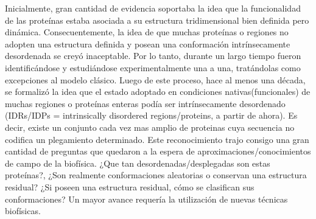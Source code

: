 Inicialmente, gran cantidad de evidencia soportaba la idea que la funcionalidad de las proteínas estaba asociada a su estructura tridimensional bien definida pero dinámica.
Consecuentemente, la idea de que muchas proteínas o regiones no adopten una estructura definida y posean una conformación intrínsecamente desordenada se creyó inaceptable. 
Por lo tanto, durante un largo tiempo fueron identificándose y estudiándose experimentalmente una a una, tratándolas como excepciones al modelo clásico.
Luego de este proceso, hace al menos una década, se formalizó la idea que el estado adoptado en condiciones nativas(funcionales) de muchas regiones o proteínas enteras podía ser intrínsecamente desordenado
(IDRs/IDPs = intrinsically disordered regions/proteins, a partir de ahora).
Es decir, existe un conjunto cada vez mas amplio de proteinas cuya secuencia no codifica un plegamiento determinado.
Este reconocimiento trajo consigo una gran cantidad de preguntas que quedaron a la espera de aproximaciones/conocimientos de campo de la biofísica.
¿Que tan desordenadas/desplegadas son estas proteínas?, ¿Son realmente conformaciones aleatorias o conservan una estructura residual?
¿Si poseen una estructura residual, cómo se clasifican sus conformaciones?
Un mayor avance requería la utilización de nuevas técnicas biofísicas\cite{eliezer2009biophysical}.

% 

